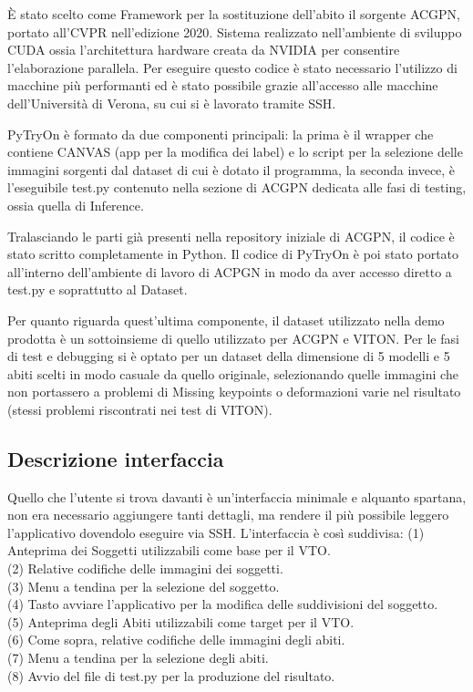 \documentclass[final, 11pt]{article}
\begin{document}
	È stato scelto come Framework per la sostituzione dell’abito il sorgente ACGPN, portato all’CVPR nell’edizione 2020. 
	Sistema realizzato nell’ambiente di sviluppo CUDA ossia l'architettura hardware creata da NVIDIA per consentire l’elaborazione parallela. Per eseguire questo codice è stato necessario l’utilizzo di macchine più performanti ed è stato possibile grazie all’accesso alle macchine dell’Università di Verona, su cui si è lavorato tramite SSH.
	
	
	PyTryOn è formato da due componenti principali: la prima è il wrapper che contiene CANVAS (app per la modifica dei label) e lo script per la selezione delle immagini sorgenti dal dataset di cui è dotato il programma, la seconda invece, è l’eseguibile test.py contenuto nella sezione di ACGPN dedicata alle fasi di testing, ossia quella di Inference.
	
	Tralasciando le parti già presenti nella repository iniziale di ACGPN, il codice è stato scritto completamente in Python. Il codice di PyTryOn è poi stato portato all’interno dell’ambiente di lavoro di ACPGN in modo da aver accesso diretto a test.py e soprattutto al Dataset.
	
	Per quanto riguarda quest’ultima componente, il dataset utilizzato nella demo prodotta è un sottoinsieme di quello utilizzato per ACGPN e VITON. Per le fasi di test e debugging si è optato per un dataset della dimensione di 5 modelli e 5 abiti scelti in modo casuale da quello originale, selezionando quelle immagini che non portassero a problemi di Missing keypoints o deformazioni varie nel risultato (stessi problemi riscontrati nei test di VITON).
	
	\subsection{Descrizione interfaccia}
	Quello che l’utente si trova davanti è un’interfaccia minimale e alquanto spartana, non era necessario aggiungere tanti dettagli, ma rendere il più possibile leggero l’applicativo dovendolo eseguire via SSH.
	L’interfaccia è così suddivisa:
\newline
	(1) Anteprima dei Soggetti utilizzabili come base per il VTO.
\\
	(2) Relative codifiche delle immagini dei soggetti.
\\
	(3) Menu a tendina per la selezione del soggetto. 
\\
	(4) Tasto avviare l’applicativo per la modifica delle suddivisioni del soggetto. 
\\
	(5) Anteprima degli Abiti utilizzabili come target per il VTO. 
\\
	(6) Come sopra, relative codifiche delle immagini degli abiti. \\
	(7) Menu a tendina per la selezione degli abiti.
\\
	(8) Avvio del file di test.py per la produzione del risultato. 
\\
	
\end{document}
